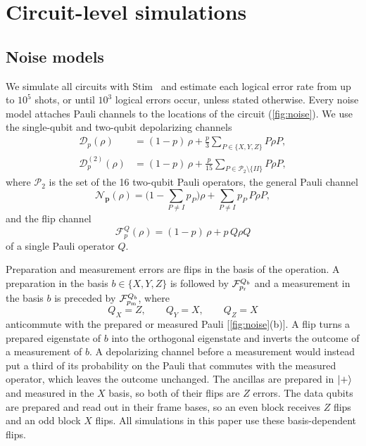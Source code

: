 \section{Circuit-level simulations}
\label{sec:results}

\subsection{Noise models}
\label{sec:noise}

We simulate all circuits with Stim~\cite{gidney2021stim} and estimate each logical error rate from up to $10^{5}$ shots, or until $10^{3}$ logical errors occur, unless stated otherwise. Every noise model attaches Pauli channels to the locations of the circuit (\autoref{fig:noise}). We use the single-qubit and two-qubit depolarizing channels
\begin{align}
  \mathcal{D}_p(\rho)&=(1-p)\,\rho+\frac{p}{3}\sum_{P\in\{X,Y,Z\}}P\rho P,\label{eq:dep1}\\
  \mathcal{D}^{(2)}_p(\rho)&=(1-p)\,\rho+\frac{p}{15}\sum_{P\in\mathcal{P}_2\setminus\{II\}}P\rho P,\label{eq:dep2}
\end{align}
where $\mathcal{P}_2$ is the set of the 16 two-qubit Pauli operators, the general Pauli channel
\begin{equation}
  \mathcal{N}_{\mathbf{p}}(\rho)=\Big(1-\sum_{P\neq I}p_P\Big)\rho+\sum_{P\neq I}p_P\,P\rho P,
  \label{eq:pauli}
\end{equation}
and the flip channel
\begin{equation}
  \mathcal{F}^{Q}_p(\rho)=(1-p)\,\rho+p\,Q\rho Q
  \label{eq:flip}
\end{equation}
of a single Pauli operator $Q$.

Preparation and measurement errors are flips in the basis of the operation. A preparation in the basis $b\in\{X,Y,Z\}$ is followed by $\mathcal{F}^{Q_b}_{p_{\rm r}}$ and a measurement in the basis $b$ is preceded by $\mathcal{F}^{Q_b}_{p_{\rm m}}$, where
\begin{equation}
  Q_X=Z,\qquad Q_Y=X,\qquad Q_Z=X
  \label{eq:flips}
\end{equation}
anticommute with the prepared or measured Pauli [\autoref{fig:noise}(b)]. A flip turns a prepared eigenstate of $b$ into the orthogonal eigenstate and inverts the outcome of a measurement of $b$. A depolarizing channel before a measurement would instead put a third of its probability on the Pauli that commutes with the measured operator, which leaves the outcome unchanged. The ancillas are prepared in $\left|+\right\rangle$ and measured in the $X$ basis, so both of their flips are $Z$ errors. The data qubits are prepared and read out in their frame bases, so an even block receives $Z$ flips and an odd block $X$ flips. All simulations in this paper use these basis-dependent flips.

